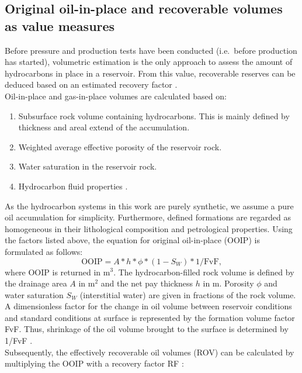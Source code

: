         \subsection{Original oil-in-place and recoverable volumes as value measures}
        Before pressure and production tests have been conducted (i.e.\ before production has started), volumetric estimation is the only approach to assess the amount of hydrocarbons in place in a reservoir. From this value, recoverable reserves can be deduced based on an estimated recovery factor \citep{dean2007volumetric, morton1993development}.\\
        Oil-in-place and gas-in-place volumes are calculated based on:
        \begin{enumerate}
        \item Subsurface rock volume containing hydrocarbons. This is mainly defined by thickness and areal extend of the accumulation.
        \item Weighted average effective porosity of the reservoir rock.
        \item Water saturation in the reservoir rock.
        \item Hydrocarbon fluid properties \citep{dean2007volumetric, morton1993development}.
        \end{enumerate}
        As the hydrocarbon systems in this work are purely synthetic, we assume a pure oil accumulation for simplicity. Furthermore, defined formations are regarded as homogeneous in their lithological composition and petrological properties. Using the factors listed above, the equation for original oil-in-place (OOIP) is formulated as follows:
        \begin{equation}\label{eq:OOIP}
        \text{OOIP} = A * h * \phi * (1 - S_W) * 1/\text{FvF},
        \end{equation}
        where OOIP is returned in m$^3$. The hydrocarbon-filled rock volume is defined by the drainage area $A$ in m$^2$ and the net pay thickness $h$ in m. Porosity $\phi$ and water saturation $S_W$ (interstitial water) are given in fractions of the rock volume. A dimensionless factor for the change in oil volume between reservoir conditions and standard conditions at surface is represented by the formation volume factor FvF. Thus, shrinkage of the oil volume brought to the surface is determined by 1/FvF \citep{dean2007volumetric, morton1993development}.\\
        Subsequently, the effectively recoverable oil volumes (ROV) can be calculated by multiplying the OOIP with a recovery factor RF \citep{dean2007volumetric, morton1993development}:
